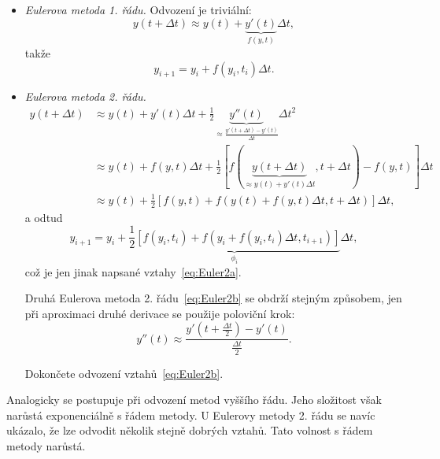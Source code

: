 \documentclass[a4paper,11pt,twoside]{article}
\theoremstyle{red}
\theoremstyle{green}
\begin{document}
    \begin{itemize}
        \item \emph{Eulerova metoda 1. řádu.} Odvození je triviální:
            \begin{equation}
                y(t+\Delta t)\approx y(t)+\underbrace{y'(t)}_{f(y,t)}\Delta t,
            \end{equation}
            takže
            \begin{equation}
                y_{i+1}=y_{i}+f(y_{i},t_{i})\Delta t.
            \end{equation}
        \item \emph{Eulerova metoda 2. řádu.}
            \begin{align}
                y(t+\Delta t)
                    &\approx y(t)+y'(t)\Delta t+\frac{1}{2}\underbrace{y''(t)}_{\approx\frac{y'(t+\Delta t)-y'(t)}{\Delta t}}\Delta t^{2}\nonumber\\
                    &\approx y(t)+f(y,t)\Delta t+\frac{1}{2}[f(\underbrace{y(t+\Delta t)}_{\approx y(t)+y'(t)\Delta t},t+\Delta t)-f(y,t)]\Delta t\nonumber\\
                    &\approx y(t)+\frac{1}{2}\left[f(y,t)+f(y(t)+f(y,t)\Delta t,t+\Delta t)\right]\Delta t,
            \end{align}
            a odtud
            \begin{equation}
                y_{i+1}=y_{i}+\underbrace{\frac{1}{2}\left[f(y_{i},t_{i})+f(y_{i}+f(y_{i},t_{i})\Delta t,t_{i+1})\right]}_{\phi_{i}}\Delta t,
            \end{equation}
            což je jen jinak napsané vztahy~\eqref{eq:Euler2a}.

            Druhá Eulerova metoda 2. řádu~\eqref{eq:Euler2b} se obdrží stejným způsobem, jen při aproximaci druhé derivace se použije poloviční krok:
            \begin{equation}
                y''(t)\approx\frac{y'\left(t+\frac{\Delta t}{2}\right)-y'(t)}{\frac{\Delta t}{2}}.
            \end{equation}

            \begin{task}
                Dokončete odvození vztahů~\eqref{eq:Euler2b}.
            \end{task}            
    \end{itemize}

    Analogicky se postupuje při odvození metod vyššího řádu.
    Jeho složitost však narůstá exponenciálně s řádem metody.
    U Eulerovy metody 2. řádu se navíc ukázalo, že lze odvodit několik stejně dobrých vztahů.
    Tato volnost s řádem metody narůstá.
\end{document}
